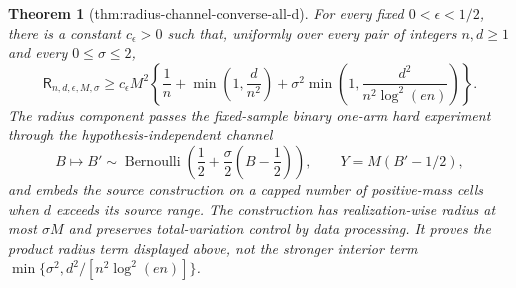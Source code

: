 \documentclass{article}
\newtheorem{theorem}{Theorem}
\begin{document}
\begin{theorem}[thm:radius-channel-converse-all-d]\label{thm:radius-channel-converse-all-d}
For every fixed \(0<\epsilon<1/2\), there is a constant \(c_{\epsilon}>0\) such that, uniformly over every pair of integers \(n,d\ge1\) and every \(0\le\sigma\le2\),
\[
 \mathsf R_{n,d,\epsilon,M,\sigma}
 \ge c_{\epsilon}M^2\left\{
 \frac1n+\min\left(1,\frac d{n^2}\right)
 +\sigma^2\min\left(1,\frac{d^2}{n^2\log^2(en)}\right)
 \right\}.
\]
The radius component passes the fixed-sample binary one-arm hard experiment through the hypothesis-independent channel
\[
 B\longmapsto B'\sim\operatorname{Bernoulli}\!\left(\frac12+\frac\sigma2\left(B-\frac12\right)\right),
 \qquad Y=M(B'-1/2),
\]
and embeds the source construction on a capped number of positive-mass cells when \(d\) exceeds its source range.  The construction has realization-wise radius at most \(\sigma M\) and preserves total-variation control by data processing.  It proves the product radius term displayed above, not the stronger interior term \(\min\{\sigma^2,d^2/[n^2\log^2(en)]\}\).
\end{theorem}
\end{document}
